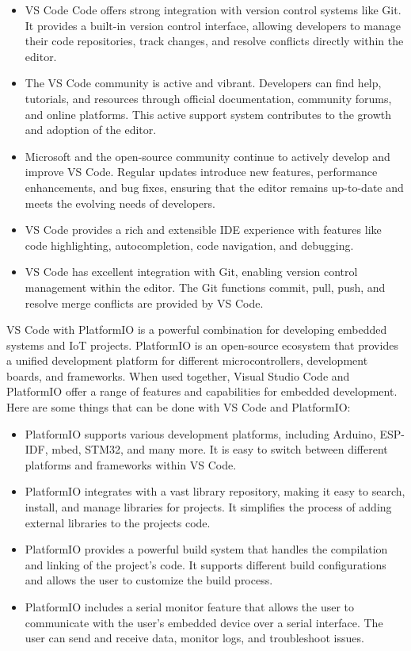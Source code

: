 \begin{itemize}
  \item \ac{VS Code} Code offers strong integration with version control systems like Git. It provides a built-in version control interface, allowing developers to manage their code repositories, track changes, and resolve conflicts directly within the editor.
  \item The \ac{VS Code} community is active and vibrant. Developers can find help, tutorials, and resources through official documentation, community forums, and online platforms. This active support system contributes to the growth and adoption of the editor.
  \item Microsoft and the open-source community continue to actively develop and improve \ac{VS Code}. Regular updates introduce new features, performance enhancements, and bug fixes, ensuring that the editor remains up-to-date and meets the evolving needs of developers.
  \item \ac{VS Code} provides a rich and extensible \ac{IDE} experience with features like code highlighting, autocompletion, code navigation, and debugging.
  \item \ac{VS Code} has excellent integration with Git, enabling version control management within the editor. The Git functions commit, pull, push, and resolve merge conflicts are provided by \ac{VS Code}.
\end{itemize}
\ac{VS Code} with PlatformIO is a powerful combination for developing embedded systems and \ac{IoT} projects. PlatformIO is an open-source ecosystem that provides a unified development platform for different microcontrollers, development boards, and frameworks. When used together, Visual Studio Code and PlatformIO offer a range of features and capabilities for embedded development. Here are some things that can be done with \ac{VS Code} and PlatformIO:
\begin{itemize}
  \item PlatformIO supports various development platforms, including Arduino, ESP-IDF, mbed, STM32, and many more. It is easy to switch between different platforms and frameworks within \ac{VS Code}.
  \item PlatformIO integrates with a vast library repository, making it easy to search, install, and manage libraries for projects. It simplifies the process of adding external libraries to the projects code.
  \item PlatformIO provides a powerful build system that handles the compilation and linking of the project's code. It supports different build configurations and allows the user to customize the build process.
  \item PlatformIO includes a serial monitor feature that allows the user to communicate with the user's embedded device over a serial interface. The user can send and receive data, monitor logs, and troubleshoot issues.
\end{itemize}
